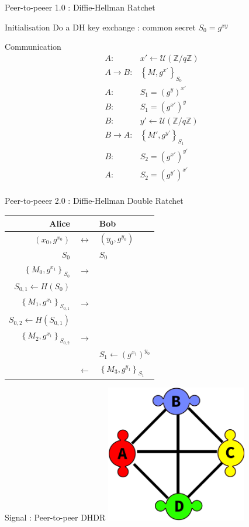 \documentclass{beamer}
\newcommand{\ZZ}{\mathbb{Z}}
\newcommand{\Uu}{\mathcal{U}}
\newcommand{\la}{\leftarrow}
\newcommand{\ra}{\rightarrow}
\newcommand{\Lla}{\longleftarrow}
\newcommand{\Lra}{\longrightarrow}
\newcommand{\Llra}{\longleftrightarrow}
\newcommand{\set}[1]{\left\{ #1 \right\}}
\begin{document}
\begin{frame}{Peer-to-peeer 1.0 : Diffie-Hellman Ratchet}
	\begin{block}{Initialisation}
		Do a DH key exchange : common secret $S_0 = g^{xy}$
	\end{block}

	\begin{block}{Communication}
	$$
      \begin{array}{rl}
        A :& x' \la \Uu(\ZZ / q\ZZ) \\
        A \ra B :& \set{M, g^{x'}}_{S_0} \\
        A :& S_1 = (g^y)^{x'} \\
        B :& S_1 = (g^{x'})^y \\
        B :& y' \la \Uu(\ZZ / q \ZZ) \\
        B \ra A :& \set{M', g^{y'}}_{S_1} \\
        B :& S_2 = (g^{x'})^{y'} \\
        A :& S_2 = (g^{y'})^{x'} \\
      \end{array}
      $$
	\end{block}
\end{frame}

\begin{frame}{Peer-to-peeer 2.0 : Diffie-Hellman Double Ratchet}
	\center
	\begin{tabular}{rcl}
		Alice & & Bob \\
		\hline
    $(x_0, g^{x_0})$ & $\Llra$ & $(y_0, g^{y_0})$ \\
		\hline
		$S_0$ & & $S_0$ \\
		\hline
		$\set{M_0, g^{x_1}}_{S_0}$ & $\Lra$ & \\
		\hline
		$S_{0, 1} \la H(S_0)$  & & \\
		\hline
		$\set{M_1, g^{x_1}}_{S_{0, 1}}$ & $\Lra$ & \\
		\hline
		$S_{0, 2} \la H(S_{0, 1})$  & & \\
		\hline
		$\set{M_2, g^{x_1}}_{S_{0, 2}}$ & $\Lra$ & \\
		\hline
		 & & $S_1 \la (g^{x_1})^{y_0}$ \\
		\hline
		 & $\Lla$ & $\set{M_3, g^{y_1}}_{S_1}$
	\end{tabular}
\end{frame}

\begin{frame}{Signal : Peer-to-peer DHDR}
	\center
	\includegraphics[height=6cm]{img/group_p2p.png}
\end{frame}
\end{document}
